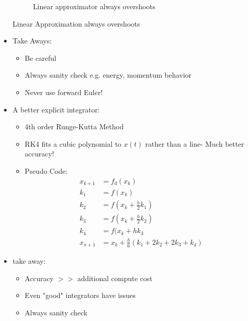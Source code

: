 \documentclass[11pt]{article}
\begin{document}
\begin{itemize}
\begin{figure}[H]
        \caption{Linear approximator always overshoots}
        \label{plot4}
    \end{figure}
    Linear Approximation always overshoots
    \item Take Aways:
    \begin{itemize}
        \item Be careful
        \item Always sanity check e.g. energy, momentum behavior
        \item Never use forward Euler!
    \end{itemize}
    \item A better explicit integrator:
    \begin{itemize}
        \item 4th order Runge-Kutta Method
        \item RK4 fits a cubic polynomial to $x(t)$ rather than a line- Much better accuracy!
        \item Pseudo Code:
        \begin{align*}
            x_{k+1} &= f_d(x_k)
            \\
            k_1 &= f(x_k)
            \\
            k_2 &= f(x_k + \frac{h}{2}k_1)
            \\
            k_3 &= f(x_k + \frac{h}{2}k_2)
            \\
            k_4 &= f(x_k + h k_3
            \\
            x_{x+1} &= x_k + \frac{h}{6}(k_1 + 2k_2 + 2k_3 + k_4)
        \end{align*}
    \end{itemize}
    \item take away:
    \begin{itemize}
        \item Accuracy $>>$ additional compute cost
        \item Even "good" integrators have issues
        \item Always sanity check
    \end{itemize}
\end{itemize}
\end{document}
